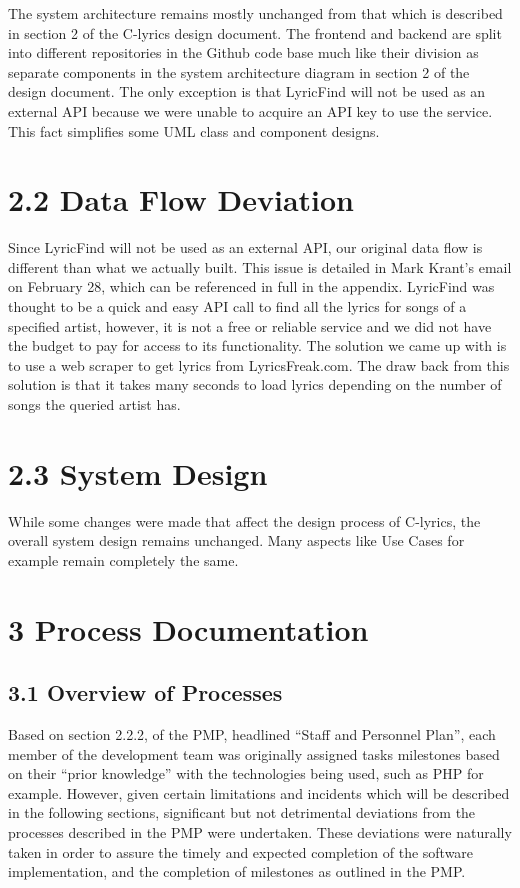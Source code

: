 \documentclass[]{article}
\begin{document}
The system architecture remains mostly unchanged from that which is
described in section 2 of the C-lyrics design document. The frontend and
backend are split into different repositories in the Github code base
much like their division as separate components in the system
architecture diagram in section 2 of the design document. The only
exception is that LyricFind will not be used as an external API because
we were unable to acquire an API key to use the service. This fact
simplifies some UML class and component designs.

\section{\textbf{2.2 Data Flow Deviation}}\label{data-flow-deviation}

Since LyricFind will not be used as an external API, our original data
flow is different than what we actually built. This issue is detailed in
Mark Krant's email on February 28, which can be referenced in full in
the appendix. LyricFind was thought to be a quick and easy API call to
find all the lyrics for songs of a specified artist, however, it is not
a free or reliable service and we did not have the budget to pay for
access to its functionality. The solution we came up with is to use a
web scraper to get lyrics from LyricsFreak.com. The draw back from this
solution is that it takes many seconds to load lyrics depending on the
number of songs the queried artist has.

\section{\textbf{2.3 System Design}}\label{system-design}

While some changes were made that affect the design process of C-lyrics,
the overall system design remains unchanged. Many aspects like Use Cases
for example remain completely the same.

\section{\textbf{3 Process Documentation}}\label{process-documentation}

\subsection{\textbf{3.1 Overview of
Processes}}\label{overview-of-processes}

Based on section 2.2.2, of the PMP, headlined ``Staff and Personnel
Plan'', each member of the development team was originally assigned
tasks milestones based on their ``prior knowledge'' with the
technologies being used, such as PHP for example. However, given certain
limitations and incidents which will be described in the following
sections, significant but not detrimental deviations from the processes
described in the PMP were undertaken. These deviations were naturally
taken in order to assure the timely and expected completion of the
software implementation, and the completion of milestones as outlined in
the PMP.
\end{document}
